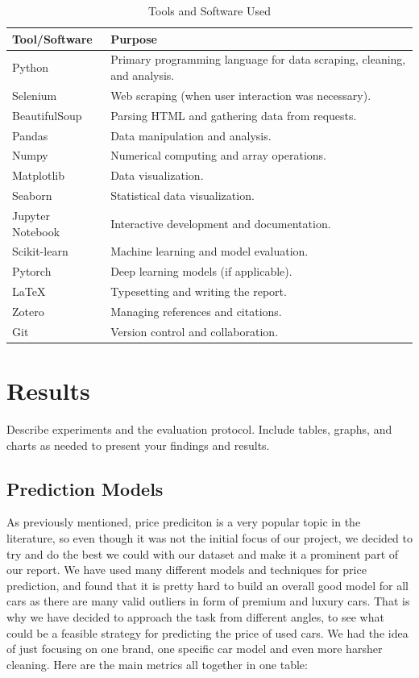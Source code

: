 \documentclass[12pt]{article}
\begin{document}
\begin{table}[H]
  \centering
  \begin{tabular}{@{}ll@{}}
    \toprule
    \textbf{Tool/Software} & \textbf{Purpose} \\
    \midrule
    Python & Primary programming language for data scraping, cleaning, and analysis. \\
    Selenium & Web scraping (when user interaction was necessary). \\
    BeautifulSoup & Parsing HTML and gathering data from requests. \\
    Pandas & Data manipulation and analysis. \\
    Numpy & Numerical computing and array operations. \\
    Matplotlib & Data visualization. \\
    Seaborn & Statistical data visualization. \\
    Jupyter Notebook & Interactive development and documentation. \\
    Scikit-learn & Machine learning and model evaluation. \\
    Pytorch & Deep learning models (if applicable). \\
    LaTeX & Typesetting and writing the report. \\
    Zotero & Managing references and citations. \\
    Git & Version control and collaboration. \\
    \bottomrule
  \end{tabular}
  \caption{Tools and Software Used}
  \label{tab:tools_software}
\end{table}

\newpage
\section{Results}
Describe experiments and the evaluation protocol. Include tables, graphs, and charts as needed to present your findings and results.

\subsection{Prediction Models}

As previously mentioned, price prediciton is a very popular topic in the literature, so even though it was not the initial focus of our project, we decided to try and do the best we could with our dataset and make it a prominent part of our report.
We have used many different models and techniques for price prediction, and found that it is pretty hard to build an overall good model for all cars as there are many valid outliers in form of premium and luxury cars.
That is why we have decided to approach the task from different angles, to see what could be a feasible strategy for predicting the price of used cars. We had the idea of just focusing on one brand, one specific car model and even more harsher cleaning.
Here are the main metrics all together in one table:
\end{document}
